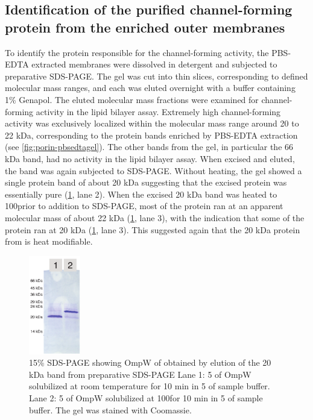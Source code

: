 \subsection{Identification of the purified channel-forming protein from the enriched outer membranes} 
To identify the protein responsible for the channel-forming activity, the \ac{PBS}-\ac{EDTA} extracted membranes were dissolved in detergent and subjected to preparative \ac{SDS-PAGE}. The gel was cut into thin slices, corresponding to defined molecular mass ranges, and each was eluted overnight with a buffer containing 1\% Genapol. The eluted molecular mass fractions were examined for channel-forming activity in the lipid bilayer assay. Extremely high channel-forming activity was exclusively localized within the molecular mass range around 20 to 22 kDa, corresponding to the protein bands enriched by \ac{PBS}-\ac{EDTA} extraction (see \cref{fig:porin-pbsedtagel}). The other bands from the gel, in particular the 66 kDa band, had no activity in the lipid bilayer assay. When excised and eluted, the band was again subjected to \ac{SDS-PAGE}. Without heating, the gel showed a single protein band of about 20 kDa suggesting that the excised protein was essentially pure (\cref{fig:porin-elutedband}, lane 2). When the excised 20 kDa band was heated to 100\cel prior to addition to \ac{SDS-PAGE}, most of the protein ran at an apparent molecular mass of about 22 kDa (\cref{fig:porin-elutedband}, lane 3), with the indication that some of the protein ran at 20 kDa (\cref{fig:porin-elutedband}, lane 3). This suggested again that the 20 kDa protein from \caulobacter is heat modifiable.

\begin{figure}[htb]
  	\begin{center}
   		\includegraphics[width=0.2\textwidth]{porin_chapter/img/Fig3-gelpurif.pdf}
   	\end{center}
   	\caption[\ac{SDS-PAGE} showing OmpW from \caulobacter obtained by elution of the 20 kDa band]{
15\% \ac{SDS-PAGE} showing OmpW of \caulobacter obtained by elution of the 20 kDa band from preparative \ac{SDS-PAGE} Lane 1: 5 \microgram of OmpW solubilized at room temperature for 10 min in 5 \microlitre of sample buffer. Lane 2: 5 \microgram of OmpW solubilized at 100\cel for 10 min in 5 \microlitre of sample buffer. The gel was stained with Coomassie.
   	}
   	\label{fig:porin-elutedband}
\end{figure}   

